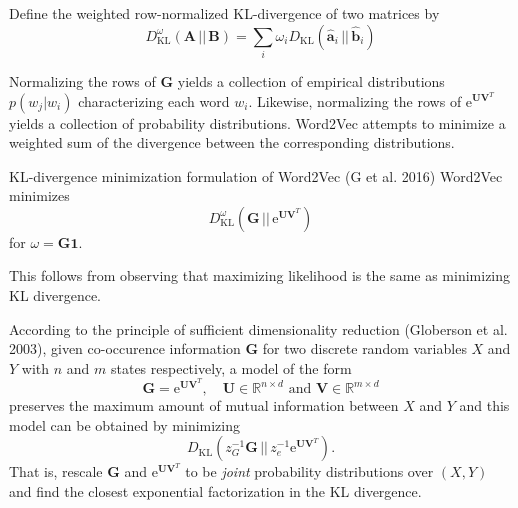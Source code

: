 \documentclass[xcolor=x11names,compress,ignorenonframetext,10pt]{beamer}
\renewcommand{\(}{\begin{columns}}
\renewcommand{\)}{\end{columns}}
\newcommand{\<}[1]{\begin{column}{#1}}
\renewcommand{\>}{\end{column}}
\def\refcolor{DodgerBlue4}
\newcommand{\refer}[1]{({\color{\refcolor}#1})}
\begin{document}
\begin{frame}
  Define the weighted row-normalized KL-divergence of two matrices by
  \[
    D^{\omega}_{\mathrm{KL}}(\mathbf{A}\,||\,\mathbf{B}) = \sum_i \omega_i  D_{\mathrm{KL}}(\hat{\mathbf{a}}_i\,||\,\hat{\mathbf{b}}_i)
  \]

  Normalizing the rows of $\mathbf{G}$ yields a collection of empirical distributions $p(w_j | w_i)$ characterizing each word $w_i.$ Likewise,
  normalizing the rows of $\mathrm{e}^{\mathbf{UV}^T}$ yields a collection of probability distributions. Word2Vec attempts to
  minimize a weighted sum of the divergence between the corresponding distributions.

  \begin{block}{KL-divergence minimization formulation of Word2Vec \refer{G et al. 2016}}
    Word2Vec minimizes 
    \[
      D^{\omega}_{\mathrm{KL}}\left(\mathbf{G}\,||\,\mathrm{e}^{\mathbf{UV}^T}\right)
    \]
    for $\omega = \mathbf{G}\mathbf{1}.$
  \end{block}

  This follows from observing that maximizing likelihood is the same as minimizing KL divergence.
\end{frame}

\begin{frame}
  According to the principle of sufficient dimensionality reduction \refer{Globerson
    et al. 2003}, given co-occurence information $\mathbf{G}$ for two discrete random
  variables $X$ and $Y$ with $n$ and $m$ states respectively, a model of the form
  \[
    \mathbf{G} = \mathrm{e}^{\mathbf{UV}^T}, \quad \mathbf{U} \in \mathbb{R}^{n \times d} \text{ and } \mathbf{V} \in \mathbb{R}^{m \times d}
  \]
  preserves the maximum amount of mutual information between $X$ and $Y$ and this model can be obtained by minimizing
  \[
    D_{\textrm{KL}}(z_G^{-1} \mathbf{G} \,||\, z_e^{-1} \mathrm{e}^{\mathbf{UV}^T}).
  \]
  That is, rescale $\mathbf{G}$ and $\mathrm{e}^{\mathbf{UV}^T}$ to be \emph{joint} probability distributions over $(X, Y)$
  and find the closest exponential factorization in the KL divergence.


\end{frame}

\end{document}
